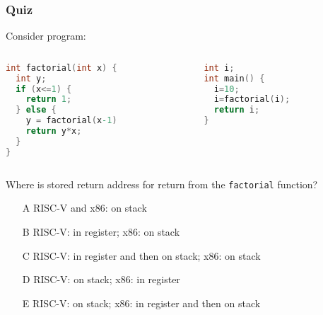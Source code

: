 \documentclass{beamer}
\begin{document}
\begin{frame}[fragile,shrink=10]
\frametitle{Quiz}

Consider program:
\begin{columns}
\begin{column}{0.45\textwidth}
\begin{lstlisting}[language={C},columns=flexible]
int factorial(int x) {
  int y;
  if (x<=1) {
    return 1;
  } else {
    y = factorial(x-1)
    return y*x;
  }
}
\end{lstlisting}
\end{column}
\hfill
\begin{column}{0.45\textwidth}  
\begin{lstlisting}[language={C},columns=flexible]
int i;
int main() {
  i=10;
  i=factorial(i);
  return i;
}
\end{lstlisting}
\end{column}
\end{columns}

Where is stored return address for return from the \texttt{factorial} function?
\begin{itemize}
\item[A] RISC-V and x86: on stack
\item[B] RISC-V: in register; x86: on stack
\item[C] RISC-V: in register and then on stack; x86: on stack
\item[D] RISC-V: on stack; x86: in register
\item[E] RISC-V: on stack; x86: in register and then on stack
\end{itemize}
\end{frame}
\end{document}
